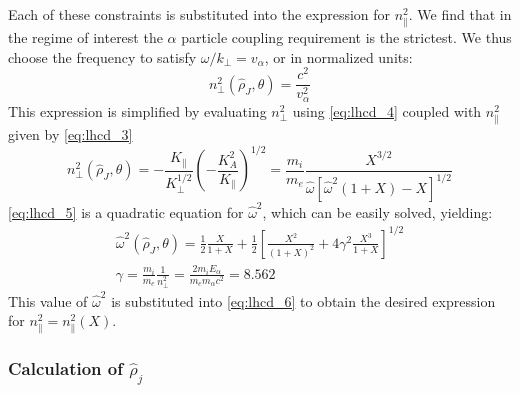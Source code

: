 Each of these constraints is substituted into the expression for $n_\parallel^2$. We find that in the regime of interest the $\alpha$ particle coupling requirement is the strictest. We thus choose the frequency to satisfy $\omega / k _ { \perp } = v _ { \alpha }$, or in normalized units:
\begin{equation}
	n _ { \perp } ^ { 2 } \left( \hat { \rho } _ { J } , \theta \right) = \frac { c ^ { 2 } } { v _ { \alpha } ^ { 2 } }
\end{equation}
This expression is simplified by evaluating $n_\perp^2$ using \cref{eq:lhcd_4} coupled with $n_\parallel^2$ given by \cref{eq:lhcd_3}
\begin{equation}
	n _ { \perp } ^ { 2 } \left( \hat { \rho } _ { J } , \theta \right) = - \frac { K _ { \| } } { K _ { \perp } ^ { 1 / 2 } } \left( - \frac { K _ { A } ^ { 2 } } { K _ { \| } } \right) ^ { 1 / 2 } = \frac { m _ { i } } { m _ { e } } \frac { X ^ { 3 / 2 } } { \hat { \omega } \left[ \hat { \omega } ^ { 2 } ( 1 + X ) - X \right] ^ { 1 / 2 } }
	\label{eq:lhcd_5}
\end{equation}
\cref{eq:lhcd_5} is a quadratic equation for $\hat \omega ^2$, which can be easily solved, yielding:
\begin{equation}
\begin{array} { c } { \hat { \omega } ^ { 2 } \left( \hat { \rho } _ { J } , \theta \right) = \frac { 1 } { 2 } \frac { X } { 1 + X } + \frac { 1 } { 2 } \left[ \frac { X ^ { 2 } } { ( 1 + X ) ^ { 2 } } + 4 \gamma ^ { 2 } \frac { X ^ { 3 } } { 1 + X } \right] ^ { 1 / 2 } } \\ { \gamma = \frac { m _ { i } } { m _ { e } } \frac { 1 } { n _ { \perp } ^ { 2 } } = \frac { 2 m _ { i } E _ { \alpha } } { m _ { e } m _ { \alpha } c ^ { 2 } } = 8.562 } \end{array}
\end{equation}
This value of $\hat \omega ^2$ is substituted into \cref{eq:lhcd_6} to obtain the desired expression for $n _ { \| } ^ { 2 } = n _ { \| } ^ { 2 } ( X )$.

\subsubsection{Calculation of $\hat \rho_j$}

